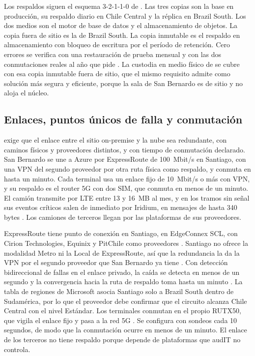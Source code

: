 Los respaldos siguen el esquema 3-2-1-1-0 de . Las tres copias son la base en
producción, su respaldo diario en Chile Central y la réplica en Brazil South. Los dos medios son el
motor de base de datos y el almacenamiento de objetos. La copia fuera de sitio es la de Brazil South.
La copia inmutable es el respaldo en almacenamiento con bloqueo de escritura por el período de
retención. Cero errores se verifica con una restauración de prueba mensual y con las dos conmutaciones
reales al año que pide . La custodia en medio físico de  se
cubre con esa copia inmutable fuera de sitio, que el mismo requisito admite como solución más segura y
eficiente, porque la sala de San Bernardo es de sitio y no aloja el núcleo.

\subsection{Enlaces, puntos únicos de falla y conmutación}\label{sec:4-enlaces}

 exige que el enlace entre el sitio on-premise y la nube sea redundante, con
caminos físicos y proveedores distintos, y con tiempo de conmutación declarado. San Bernardo se une a Azure por ExpressRoute de
100~Mbit/s en Santiago, con una VPN del segundo proveedor por otra ruta física como respaldo, y conmuta
en hasta un minuto. Cada terminal usa un enlace fijo de 10~Mbit/s o más con VPN, y su respaldo es el
router 5G con dos SIM, que conmuta en menos de un minuto. El camión transmite por LTE entre 13 y 16~MB
al mes, y en los tramos sin señal sus eventos críticos salen de inmediato por Iridium, en mensajes de
hasta 340 bytes \parencite{groundcontrol_edge}. Los camiones de terceros llegan por las plataformas de
sus proveedores.

ExpressRoute tiene punto de conexión en Santiago, en EdgeConnex SCL, con Cirion Technologies, Equinix y
PitChile como proveedores \parencite{ms_er_locations}. Santiago no ofrece la modalidad Metro ni la Local
de ExpressRoute, así que la redundancia la da la VPN por el segundo proveedor que San Bernardo ya tiene
. Con detección bidireccional de fallas en el enlace privado, la caída se detecta
en menos de un segundo y la convergencia hacia la ruta de respaldo toma hasta un minuto
\parencite{ms_er_bfd}. La tabla de regiones de Microsoft asocia Santiago solo a Brazil South dentro de
Sudamérica, por lo que el proveedor debe confirmar que el circuito alcanza Chile Central con el nivel
Estándar. Los terminales conmutan en el propio RUTX50, que vigila el enlace fijo y pasa a la red 5G
\parencite{teltonika_rutx50}. Se configura con sondeos cada 10 segundos, de modo que la conmutación
ocurre en menos de un minuto. El enlace de los terceros no tiene respaldo porque depende de plataformas
que audIT no controla.

